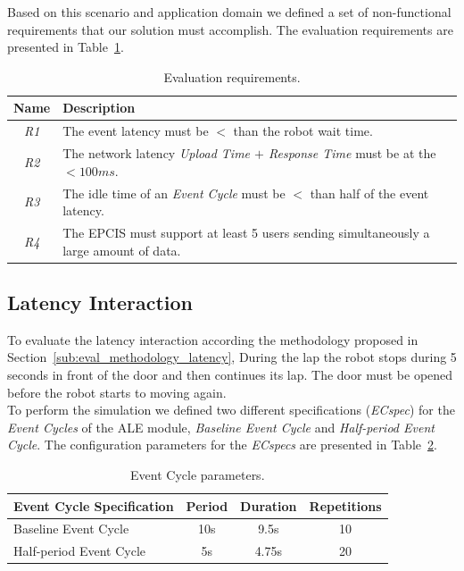 Based on this scenario and application domain we defined a set of non-functional requirements that
our solution must accomplish. The evaluation requirements are presented in Table~\ref{table:eval_requirements}.

\begin{table}[ht!]
  \begin{tabular}{|c|l|}
    \hline
    Name          & Description                                                                                            \\ \hline
    \textit{R1}   & The event latency must be $<$ than the robot wait time.                                                \\ \hline
    \textit{R2}   & The network latency \textit{Upload Time $+$ Response Time} must be at the $< 100ms$.                    \\ \hline
    \textit{R3}   & The idle time of an \textit{Event Cycle} must be $<$ than half of the event latency.                   \\ \hline
    \textit{R4}   & The EPCIS must support at least 5 users sending simultaneously a large amount of data.                 \\ \hline
  \end{tabular}
  \caption{Evaluation requirements.}
  \label{table:eval_requirements}
\end{table}

\subsection{Latency Interaction}
\label{sub:eval_exp_latency}
To evaluate the latency interaction according the methodology proposed in Section~\ref{sub:eval_methodology_latency},
During the lap the robot stops during 5 seconds in front of the door and then continues its lap.
The door must be opened before the robot starts to moving again.\\

To perform the simulation we defined two different specifications (\textit{ECspec}) for the
\textit{Event Cycles} of the \gls{ALE} module, \textit{Baseline Event Cycle} and
\textit{Half-period Event Cycle}. The configuration parameters for the \textit{ECspecs} are presented
in Table~\ref{table:ecspec_parameters}.

\begin{table}[ht!]
  \begin{tabular}{|l|c|c|c|}
    \hline
    Event Cycle Specification & Period  & Duration & Repetitions \\ \hline
    Baseline Event Cycle      &  10s    & 9.5s     & 10          \\ \hline
    Half-period Event Cycle   &   5s    & 4.75s    & 20          \\ \hline
  \end{tabular}
  \caption[Event Cycle parameters.]{Event Cycle parameters.}
  \label{table:ecspec_parameters}
\end{table}

